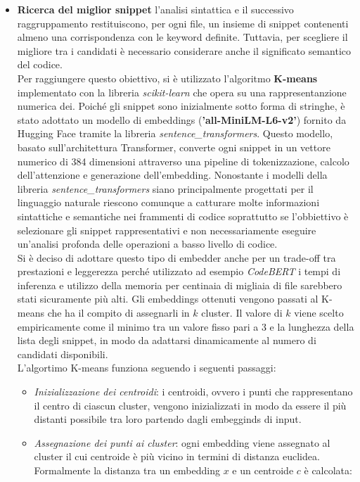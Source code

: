\documentclass{article}
\begin{document}
\begin{itemize}
    \item \textbf{Ricerca del miglior snippet} l'analisi sintattica e il successivo raggruppamento restituiscono, per ogni file, un insieme di snippet contenenti almeno una corrispondenza con le keyword definite. Tuttavia, per scegliere il migliore tra i candidati è necessario considerare anche il significato semantico del codice.\\
    Per raggiungere questo obiettivo, si è utilizzato l'algoritmo \textbf{K-means} implementato con la libreria \textit{scikit-learn}\cite{scikit-learn} che opera su una rappresentanzione numerica dei. Poiché gli snippet sono inizialmente sotto forma di stringhe, è stato adottato un modello di embeddings (\textbf{'all-MiniLM-L6-v2'}) fornito da Hugging Face tramite la libreria \textit{sentence\_transformers}. Questo modello, basato sull’architettura Transformer, converte ogni snippet in un vettore numerico di 384 dimensioni attraverso una pipeline di tokenizzazione, calcolo dell’attenzione e generazione dell’embedding. Nonostante i modelli della libreria \textit{sentence\_transformers} siano principalmente progettati per il linguaggio naturale riescono comunque a catturare molte informazioni sintattiche e semantiche nei frammenti di codice soprattutto se l'obbiettivo è selezionare gli snippet rappresentativi e non necessariamente eseguire un'analisi profonda delle operazioni a basso livello di codice.\\
    Si è deciso di adottare questo tipo di embedder anche per un trade-off tra prestazioni e leggerezza perché utilizzato ad esempio \textit{CodeBERT} i tempi di inferenza e utilizzo della memoria per centinaia di migliaia di file sarebbero stati sicuramente più alti. 
    Gli embeddings ottenuti vengono passati al K-means che ha il compito di assegnarli in $k$ cluster. Il valore di $k$ viene scelto empiricamente come il minimo tra un valore fisso pari a 3 e la lunghezza della lista degli snippet, in modo da adattarsi dinamicamente al numero di candidati disponibili.\\
    L'algortimo K-means funziona seguendo i seguenti passaggi:
    \begin{itemize}
        \item \textit{Inizializzazione dei centroidi}: i centroidi, ovvero i punti che rappresentano il centro di ciascun cluster, vengono inizializzati in modo da essere il più distanti possibile tra loro partendo dagli embegginds di input.
        \item \textit{Assegnazione dei punti ai cluster}: ogni embedding viene assegnato al cluster il cui centroide è più vicino in termini di distanza euclidea. Formalmente la distanza tra un embedding $x$ e un centroide $c$ è calcolata:

\end{itemize}
\end{itemize}
\end{document}
